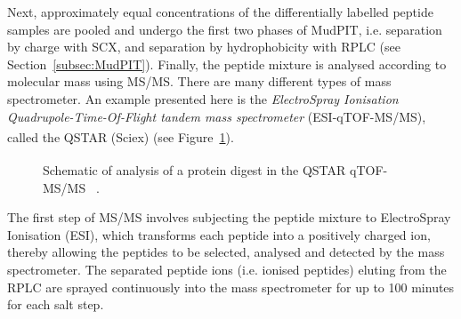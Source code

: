 Next, approximately equal concentrations of the differentially labelled peptide samples are pooled and undergo the first two phases of MudPIT, i.e. separation by charge with SCX, and separation by hydrophobicity with RPLC (see Section~\ref{subsec:MudPIT}). Finally, the peptide mixture is analysed according to molecular mass using MS/MS. There are many different types of mass spectrometer. An example presented here is the \emph{ElectroSpray Ionisation Quadrupole-Time-Of-Flight tandem mass spectrometer} (ESI-qTOF-MS/MS), called the QSTAR\textsuperscript{\textregistered} (Sciex) (see Figure~\ref{fig:MS/MS}). 
  
\begin{figure}[htb]
\caption{Schematic of analysis of a protein digest in the QSTAR\textsuperscript{\textregistered} qTOF-MS/MS ~\citep{Applied2004}.}
\label{fig:MS/MS}
\end{figure}

The first step of MS/MS involves subjecting the peptide mixture to ElectroSpray Ionisation (ESI), which transforms each peptide into a positively charged ion, thereby allowing the peptides to be selected, analysed and detected by the mass spectrometer. The separated peptide ions (i.e. ionised peptides) eluting from the RPLC are sprayed continuously into the mass spectrometer for up to 100 minutes for each salt step.   


